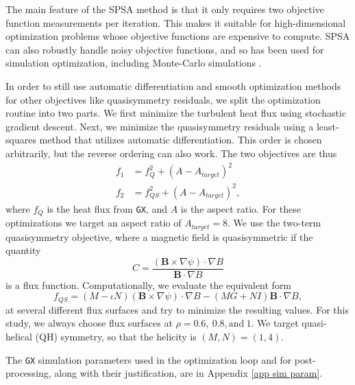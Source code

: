 \documentclass{jpp}
\begin{document}
The main feature of the SPSA method is that it only requires two objective function measurements per iteration. This makes it suitable for high-dimensional optimization problems whose objective functions are expensive to compute. SPSA can also robustly handle noisy objective functions, and so has been used for simulation optimization, including Monte-Carlo simulations \citep{Chan2003OptimisationApproximation}.


In order to still use automatic differentiation and smooth optimization methods for other objectives like quasisymmetry residuals, we split the optimization routine into two parts. We first minimize the turbulent heat flux using stochastic gradient descent. Next, we minimize the quasisymmetry residuals using a least-squares method that utilizes automatic differentiation. This order is chosen arbitrarily, but the reverse ordering can also work. The two objectives are thus
\begin{align}
    f_1 &= f_{Q}^2 + \left(A - A_{target}\right)^2 \\
    f_2 &= f_{QS}^2 + \left(A - A_{target}\right)^2,
\end{align}
where $f_Q$ is the heat flux from {\tt GX}, and $A$ is the aspect ratio. For these optimizations we target an aspect ratio of $A_{target} = 8$. We use the two-term quasisymmetry objective, where a magnetic field is quasisymmetric if the quantity
\begin{equation}
    C = \frac{\left(\mathbf{B} \times \nabla \psi\right) \cdot \nabla B}{\mathbf{B} \cdot \nabla B}
\end{equation}
is a flux function. Computationally, we evaluate the equivalent form
\begin{equation}
    f_{QS} = \left(M - \iota N\right)\left(\mathbf{B} \times \nabla \psi\right)\cdot \nabla B - \left(MG + NI\right)\mathbf{B} \cdot \nabla B,
\end{equation}
at several different flux surfaces and try to minimize the resulting values. For this study, we always choose flux surfaces at $\rho = 0.6, \ 0.8, \text{and} \ 1$. We target quasi-helical (QH) symmetry, so that the helicity is $(M, N) = (1, 4)$.

The {\tt GX} simulation parameters used in the optimization loop and for post-processing, along with their justification, are in Appendix \ref{app sim param}.
\end{document}
